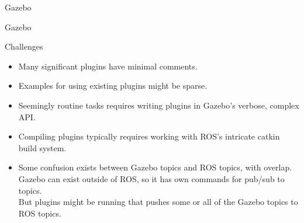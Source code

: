 \documentclass[9pt]{beamer}
\begin{document}
\begin{section}{Gazebo}
\begin{frame}{Gazebo}
\begin{block}{Challenges}
\begin{itemize}
                \item Many significant plugins have minimal comments. \\
                \item Examples for using existing plugins might be sparse. 
                \item Seemingly routine tasks requires writing plugins in Gazebo's verbose, complex API. 
                \item Compiling plugins typically requires working with ROS's intricate catkin build system. 
                \item Some confusion exists between Gazebo topics and ROS topics, with overlap. \\
                Gazebo can exist outside of ROS, so it has own commands for pub/sub to topics. \\
                But plugins might be running that pushes some or all of the Gazebo topics to ROS topics. 
            \end{itemize}
        \end{block}
    \end{frame}
    
\end{section}    
    
\end{document}
